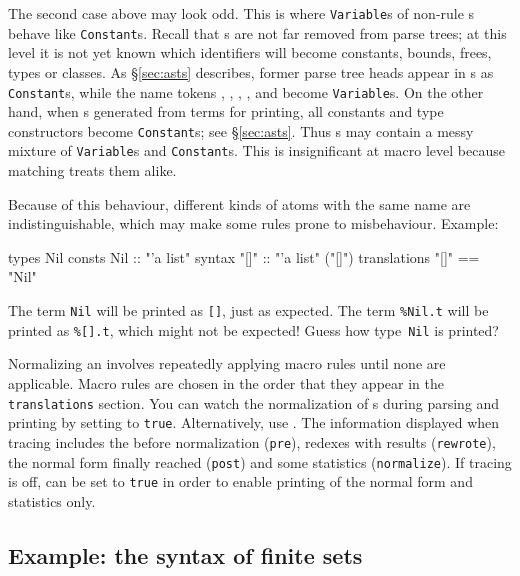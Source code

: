 The second case above may look odd.  This is where {\tt Variable}s of
non-rule \AST{}s behave like {\tt Constant}s.  Recall that \AST{}s are not
far removed from parse trees; at this level it is not yet known which
identifiers will become constants, bounds, frees, types or classes.  As
\S\ref{sec:asts} describes, former parse tree heads appear in \AST{}s as
{\tt Constant}s, while the name tokens , , ,
,  and  become {\tt Variable}s.  On the other
hand, when \AST{}s generated from terms for printing, all constants and type
constructors become {\tt Constant}s; see \S\ref{sec:asts}.  Thus \AST{}s may
contain a messy mixture of {\tt Variable}s and {\tt Constant}s.  This is
insignificant at macro level because matching treats them alike.

Because of this behaviour, different kinds of atoms with the same name are
indistinguishable, which may make some rules prone to misbehaviour.  Example:
\begin{ttbox}
types
  Nil
consts
  Nil     :: "'a list"
syntax
  "[]"    :: "'a list"    ("[]")
translations
  "[]"    == "Nil"
\end{ttbox}
The term {\tt Nil} will be printed as {\tt []}, just as expected.
The term \verb|%Nil.t| will be printed as \verb|%[].t|, which might not be
expected!  Guess how type~{\tt Nil} is printed?

Normalizing an \AST{} involves repeatedly applying macro rules until none
are applicable.  Macro rules are chosen in the order that they appear in the
{\tt translations} section.  You can watch the normalization of \AST{}s
during parsing and printing by setting  to
{\tt true}. Alternatively, use
.  The information displayed when tracing
includes the \AST{} before normalization ({\tt pre}), redexes with results
({\tt rewrote}), the normal form finally reached ({\tt post}) and some
statistics ({\tt normalize}).  If tracing is off,
 can be set to {\tt true} in order to enable
printing of the normal form and statistics only.


\subsection{Example: the syntax of finite sets}

